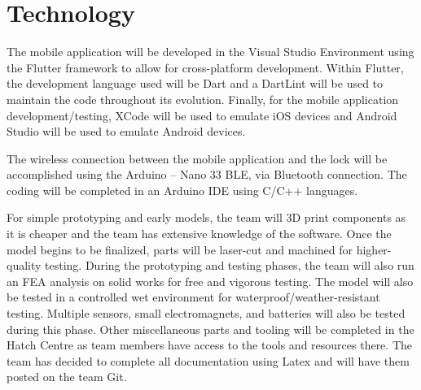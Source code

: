 \documentclass{article}
\begin{document}

\section{Technology}

The mobile application will be developed in the Visual Studio Environment using the Flutter framework to allow for cross-platform development.  Within Flutter, the development language used will be Dart and a DartLint will be used to maintain the code throughout its evolution.  Finally, for the mobile application development/testing, XCode will be used to emulate iOS devices and Android Studio will be used to emulate Android devices. 


The wireless connection between the mobile application and the lock will be accomplished using the Arduino – Nano 33 BLE, via Bluetooth connection.  The coding will be completed in an Arduino IDE using C/C++ languages.

For simple prototyping and early models, the team will 3D print components as it is cheaper and the team has extensive knowledge of the software. Once the model begins to be finalized, parts will be laser-cut and machined for higher-quality testing. During the prototyping and testing phases, the team will also run an FEA analysis on solid works for free and vigorous testing. The model will also be tested in a controlled wet environment for waterproof/weather-resistant testing. Multiple sensors, small electromagnets, and batteries will also be tested during this phase. Other miscellaneous parts and tooling will be completed in the Hatch Centre as team members have access to the tools and resources there. The team has decided to complete all documentation using Latex and will have them posted on the team Git.
\end{document}
